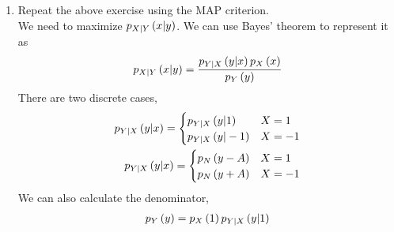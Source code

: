 \documentclass[journal,12pt,twocolumn]{IEEEtran}
\renewcommand\thesection{\arabic{section}}
\begin{document}
\begin{enumerate}[label=\thesection.\arabic*
,ref=\thesection.\theenumi]
\begin{align}
\end{align}
%
To find maximum $P_e$, we can differenciate \eqref{eq:Pe_threshold2}
\begin{align}
	0 &= \frac{dP_e}{d\delta} \\
	0 &= \brak{p} p_N\brak{\delta-A} \\
    &+ \brak{1-p}\sbrak{-p_N\brak{A+\delta}  }
\end{align}
\begin{align}
	\brak{p} p_N\brak{\delta-A}  &= \brak{1-p}  p_N\brak{A+\delta} \\
	\frac{ \brak{p} \exp{\brak{ -\frac{\brak{\delta-A}^2}{2} } }}  {\sqrt{2\pi}} &= 
	\frac{ \brak{1-p} \exp{\brak{ -\frac{\brak{A+\delta}^2}{2} } }}  {\sqrt{2\pi}} \\
	\ln{\brak{p}} - \frac{1}{2} \brak{\delta-A}^2 &= \ln{\brak{1-p}} -\frac{1}{2} \brak{\delta+A}^2 
\end{align}
\begin{align}
	\frac{1}{2} \brak{\delta+A}^2 - \frac{1}{2} \brak{\delta-A}^2 &=  \ln{\brak{\frac{1-p}{p} } }  
\end{align}
The required threshold value is
\begin{align}
	\delta  &= \frac{1}{2A} \ln{\brak{\frac{1-p}{p} } } 
\end{align}
%
\item Repeat the above exercise using the MAP criterion.
\\
\solution We need to maximize $p_{X|Y}\left(x|y\right)$. We can use Bayes' theorem to represent it as
\begin{align}
	p_{X|Y}\left(x|y\right) = \frac{ p_{Y|X}\left(y|x\right) p_X\left(x\right) }{ p_Y\left(y\right) }
\end{align}
There are two discrete cases,
\begin{align}
	 p_{Y|X}\left(y|x\right) = 
	 \begin{cases}
	 	p_{Y|X}\left(y|1\right) & X = 1 \\
	 	p_{Y|X}\left(y|-1\right) & X = -1 
	 \end{cases} \\
	 p_{Y|X}\left(y|x\right) = 
	 \begin{cases}
	 	p_N\left(y-A\right)   & X = 1 \\ 
	 	p_N\left(y+A\right)  & X = -1 
	 \end{cases} 
\end{align}
We can also calculate the denominator,
\begin{align}
	\begin{split}
		p_Y\brak{y} &= p_X\brak{1} p_{Y|X}\brak{y|1}  \\

\end{split}
\end{align}
\end{enumerate}
\end{document}
